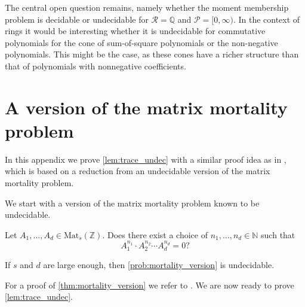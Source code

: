 The central open question remains, namely whether the moment membership problem is decidable or undecidable for $\mathcal{R} = \mathbb{Q}$ and $\mathcal{P} = [0, \infty)$. In the context of rings it would be interesting whether it is undecidable for commutative polynomials for the cone of sum-of-square polynomials or the non-negative polynomials. This might be the case, as these cones have a richer structure than that of polynomials with nonnegative coefficients.





\appendix

\section{A version of the matrix mortality problem}
\label{app:matrixMortality}

In this appendix we prove \cref{lem:trace_undec} with a similar proof idea as in \cite{DCCW, Kl22}, which is based on a reduction from an undecidable version of the matrix mortality problem.

We start with a version of the matrix mortality problem known to be undecidable.

\begin{problem}\label{prob:mortality_version}
Let $A_1, \ldots, A_d \in \mathrm{Mat}_s(\mathbb{Z})$. Does there exist a choice of $n_1, \ldots, n_d \in \mathbb{N}$ such that
$$ A_1^{n_1} \cdot A_2^{n_2} \cdots A_{d}^{n_d} = 0?$$
\end{problem}

\begin{theorem}\label{thm:mortality_version}
If $s$ and $d$ are large enough, then \cref{prob:mortality_version} is undecidable.
\end{theorem}
For a proof of \cref{thm:mortality_version} we refer to \cite{Be08}.
We are now ready to prove \cref{lem:trace_undec}.

